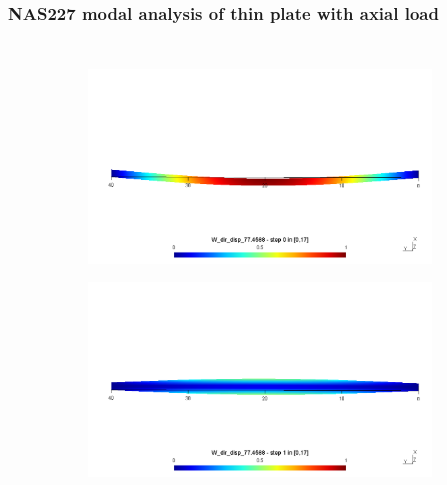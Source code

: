 \documentclass[9pt]{beamer}
\begin{document}

\begin{frame}
\frametitle{NAS227 modal analysis of thin plate with axial load}

\begin{columns}

\begin{figure}[h!]
\centering
\begin{subfigure}{1\textwidth}
\includegraphics[width=\linewidth,trim={0 8cm 0 8cm},clip]{NAS277_pos_1.png}
\end{subfigure} \vfill
\begin{subfigure}{1\textwidth}
\includegraphics[width=\linewidth,trim={0 8cm 0 8cm},clip]{NAS277_pos_2.png}

\end{subfigure}
\end{figure}
\end{columns}
\end{frame}
\end{document}
